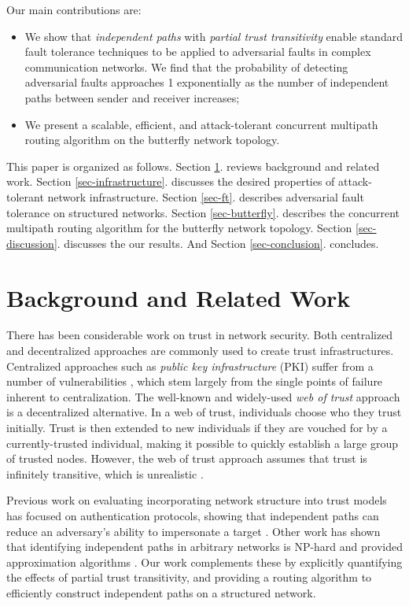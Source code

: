 \documentclass{sig-alternate-05-2015}
\begin{document}
Our main contributions are:
\begin{itemize}
\item{
We show that {\em independent paths} with {\em partial trust transitivity}
enable standard fault tolerance techniques to be applied to adversarial faults in
complex communication networks.
We find that the probability of detecting adversarial faults
approaches 1 exponentially as the number of independent paths between
sender and receiver increases;
}
\item{We present a scalable, efficient, and attack-tolerant concurrent
multipath routing algorithm on the butterfly network topology.}
\end{itemize}

This paper is organized as follows.
Section \ref{sec-related}. reviews background and related work.
Section \ref{sec-infrastructure}. discusses the desired properties of attack-tolerant network
infrastructure.
Section \ref{sec-ft}. describes adversarial fault tolerance on
structured networks.
Section \ref{sec-butterfly}. describes the concurrent multipath routing
algorithm for the butterfly network topology.
Section \ref{sec-discussion}. discusses the our results.
And Section \ref{sec-conclusion}. concludes.

\section{Background and Related Work}
\label{sec-related}

There has been considerable work on trust in network security.
Both centralized and decentralized approaches are commonly used to create
trust infrastructures.
Centralized approaches such as {\em public key infrastructure} (PKI)
suffer from a number of vulnerabilities
\cite{ellison_ten_2000},
which stem largely from the single points of failure inherent to
centralization.
The well-known and widely-used {\em web of trust} approach
\cite{zimmermann_official_1995,ferguson_practical_2003}
is a decentralized alternative.
In a web of trust,
individuals choose who they trust initially.
Trust is then extended to new individuals if they are vouched for by a
currently-trusted individual,
making it possible to quickly establish a large group of trusted nodes.
However, the web of trust approach assumes that trust is infinitely
transitive,
which is unrealistic
\cite{christianson_why_1997}.

Previous work on evaluating incorporating network structure into
trust models has focused on authentication
protocols, showing that independent paths can reduce an adversary's ability
to impersonate a target
\cite{levien_attack-resistant_2009}.
Other work has shown that identifying independent paths in arbitrary networks
is NP-hard and provided approximation algorithms
\cite{reiter_resilient_1998}.
Our work complements these by explicitly quantifying the effects of partial
trust transitivity,
and providing a routing algorithm to efficiently construct independent
paths on a structured network.
\end{document}
